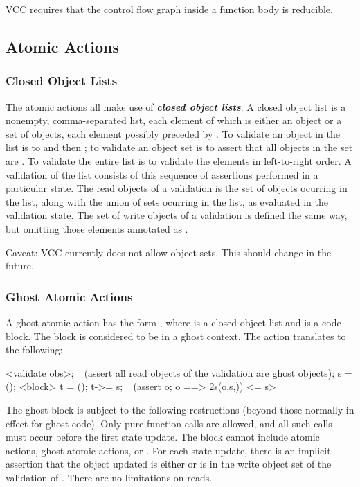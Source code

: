 \documentclass[preprint,nocopyrightspace]{sigplanconf}
\newcommand{\Def}[1]{\textit{\textbf{#1}}}
\begin{document}
{{{VCC requires that the control flow graph inside a function body is
reducible. 

\subsection{Atomic Actions}

\subsubsection{Closed Object Lists}
The atomic actions all make use of \Def{closed object lists}. A closed
object list is a nonempty, comma-separated list, each element of which is either
an object or a set of objects, each element possibly preceded
by . To validate an object  in the list is to 
 and then ;
to validate an object set is to assert that all
objects in the set are \vcc{\closed}. To validate the entire list is
to validate the elements in left-to-right order. A validation of the
list consists of this sequence of assertions performed in a particular
state. The read objects of a validation is the set of objects ocurring
in the list, along with the union of sets ocurring in the list, as
evaluated in the validation state. The set of write objects of a validation
is defined the same way, but omitting those elements annotated
as . 

Caveat: VCC currently does not allow object sets. This should change
in the future.

\subsubsection{Ghost Atomic Actions}
A ghost atomic action has the form ,
where  is a closed object list and  is a code
block. The block is considered to be in a ghost context. 
The action translates to the following:

\begin{VCC}
<validate obs>;
_(assert all read objects of the validation are ghost objects);
\state s = \now();
<block>
\state t = \now();
t->\last = s;
_(assert \forall \object o; o 
  ==> \inv2s(o,s,\now))
<\last = s>
\end{VCC}

The ghost block is subject to the following restructions (beyond those
normally in effect for ghost code). Only pure function calls are
allowed, and all such calls must occur before the first state update. The
block cannot include atomic actions, ghost atomic
actions,  or . For each state update,
there is an implicit assertion that the object updated is
either \vcc{\mutable} or is in the write object set of the validation
of . There are no limitations on reads.

}}}
\end{document}
